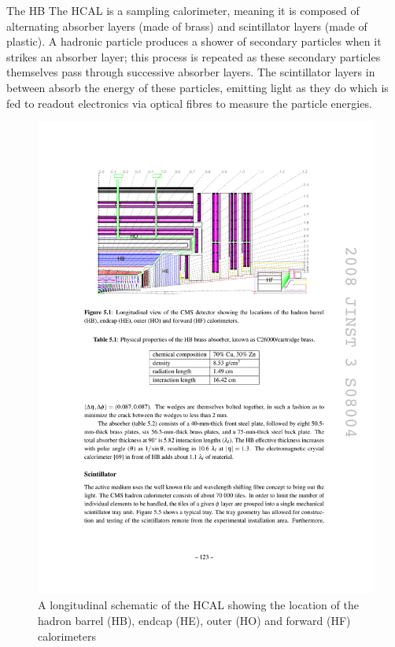 The HB
The HCAL is a sampling calorimeter, meaning it is composed of alternating absorber layers (made of brass) and
scintillator layers (made of plastic). A hadronic particle produces a shower of secondary particles when it
strikes an absorber layer; this process is repeated as these secondary particles themselves pass through
successive absorber layers. The scintillator layers in between absorb the energy of these particles, emitting
light as they do which is fed to readout electronics via optical fibres to measure the particle energies. 



\begin{figure}[hbtp]
   \centering
     \includegraphics[width=\textwidth]{Chapters/03_Detector/Images/HCAL.pdf}\hfill
     \caption{A longitudinal schematic of the HCAL showing the location of the hadron barrel (HB), endcap
     (HE), outer (HO) and forward (HF) calorimeters \cite{CMS_experiment}}
     \label{fig:CMS_HCAL}
\end{figure} 

